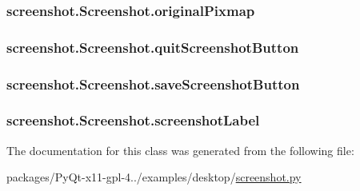 \subsubsection[{original\+Pixmap}]{\setlength{\rightskip}{0pt plus 5cm}screenshot.\+Screenshot.\+original\+Pixmap}\label{classscreenshot_1_1Screenshot_a6d3dd2a259de5e5eca5b8d55dc51d46c}
\hypertarget{classscreenshot_1_1Screenshot_ab963a38e99223e0fefa1cabffcc51e67}{}
\subsubsection[{quit\+Screenshot\+Button}]{\setlength{\rightskip}{0pt plus 5cm}screenshot.\+Screenshot.\+quit\+Screenshot\+Button}\label{classscreenshot_1_1Screenshot_ab963a38e99223e0fefa1cabffcc51e67}
\hypertarget{classscreenshot_1_1Screenshot_a3a4146ce72d30282f261a824937173c6}{}
\subsubsection[{save\+Screenshot\+Button}]{\setlength{\rightskip}{0pt plus 5cm}screenshot.\+Screenshot.\+save\+Screenshot\+Button}\label{classscreenshot_1_1Screenshot_a3a4146ce72d30282f261a824937173c6}
\hypertarget{classscreenshot_1_1Screenshot_a46afb19fccafc6177b099b1a8bc8ea89}{}
\subsubsection[{screenshot\+Label}]{\setlength{\rightskip}{0pt plus 5cm}screenshot.\+Screenshot.\+screenshot\+Label}\label{classscreenshot_1_1Screenshot_a46afb19fccafc6177b099b1a8bc8ea89}


The documentation for this class was generated from the following file\+:\begin{DoxyCompactItemize}
\item 
packages/\+Py\+Qt-\/x11-\/gpl-\/4../examples/desktop/\hyperlink{screenshot_8py}{screenshot.\+py}\end{DoxyCompactItemize}
